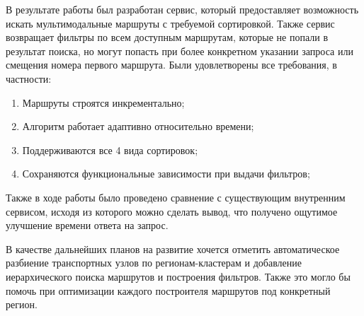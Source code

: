 \startconclusionpage
В результате работы был разработан сервис, который предоставляет возможность искать мультимодальные маршруты с требуемой сортировкой. Также сервис возвращает фильтры по всем доступным маршрутам, которые не попали в результат поиска, но могут попасть при более конкретном указании запроса или смещения номера первого маршрута. Были удовлетворены все требования, в частности:
\begin{enumerate}
	\item Маршруты строятся инкрементально;
	\item Алгоритм работает адаптивно относительно времени;
	\item Поддерживаются все 4 вида сортировок;
	\item Сохраняются функциональные зависимости при выдачи фильтров;
\end{enumerate}

Также в ходе работы было проведено сравнение с существующим внутренним сервисом, исходя из которого можно сделать вывод, что получено ощутимое улучшение времени ответа на запрос.

В качестве дальнейших планов на развитие хочется отметить автоматическое разбиение транспортных узлов по регионам-кластерам и добавление иерархического поиска маршрутов и построения фильтров. Также это могло бы помочь при оптимизации каждого построителя маршрутов под конкретный регион.